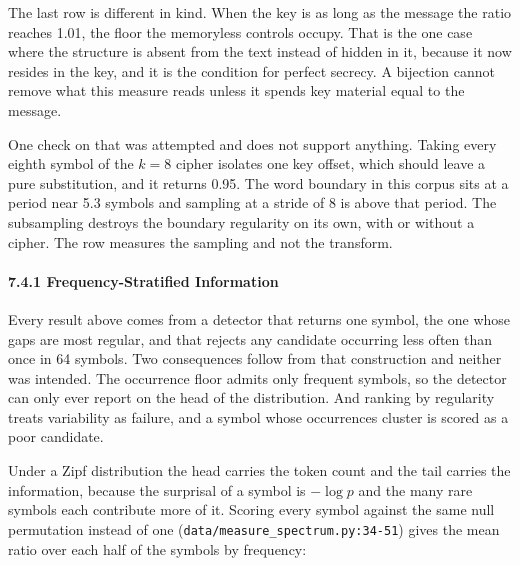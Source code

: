 The last row is different in kind. When the key is as long as the message the ratio reaches 1.01, the floor the memoryless controls occupy. That is the one case where the structure is absent from the text instead of hidden in it, because it now resides in the key, and it is the condition for perfect secrecy. A bijection cannot remove what this measure reads unless it spends key material equal to the message.

One check on that was attempted and does not support anything. Taking every eighth symbol of the \(k = 8\) cipher isolates one key offset, which should leave a pure substitution, and it returns 0.95. The word boundary in this corpus sits at a period near 5.3 symbols and sampling at a stride of 8 is above that period. The subsampling destroys the boundary regularity on its own, with or without a cipher. The row measures the sampling and not the transform.

\paragraph{7.4.1 Frequency-Stratified Information}

Every result above comes from a detector that returns one symbol, the one whose gaps are most regular, and that rejects any candidate occurring less often than once in 64 symbols. Two consequences follow from that construction and neither was intended. The occurrence floor admits only frequent symbols, so the detector can only ever report on the head of the distribution. And ranking by regularity treats variability as failure, and a symbol whose occurrences cluster is scored as a poor candidate.

Under a Zipf distribution the head carries the token count and the tail carries the information, because the surprisal of a symbol is \(-\log p\) and the many rare symbols each contribute more of it. Scoring every symbol against the same null permutation instead of one (\texttt{data/\allowbreak{}measure\_\allowbreak{}spectrum.\allowbreak{}py:34-\allowbreak{}51}) gives the mean ratio over each half of the symbols by frequency:

